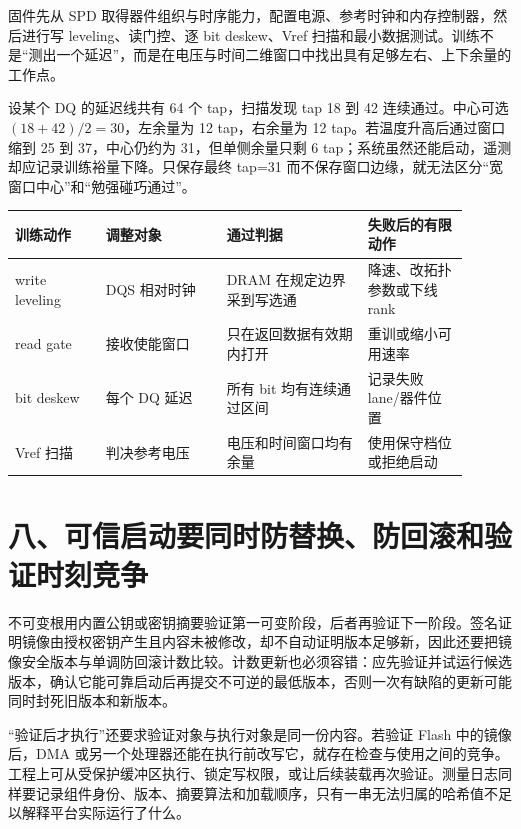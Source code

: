 
固件先从 SPD 取得器件组织与时序能力，配置电源、参考时钟和内存控制器，然后进行写 leveling、读门控、逐 bit deskew、Vref 扫描和最小数据测试。训练不是“测出一个延迟”，而是在电压与时间二维窗口中找出具有足够左右、上下余量的工作点。

设某个 DQ 的延迟线共有 64 个 tap，扫描发现 tap 18 到 42 连续通过。中心可选 $(18+42)/2=30$，左余量为 12 tap，右余量为 12 tap。若温度升高后通过窗口缩到 25 到 37，中心仍约为 31，但单侧余量只剩 6 tap；系统虽然还能启动，遥测却应记录训练裕量下降。只保存最终 tap=31 而不保存窗口边缘，就无法区分“宽窗口中心”和“勉强碰巧通过”。

\begin{longtable}{L{0.18\linewidth}L{0.24\linewidth}L{0.28\linewidth}L{0.20\linewidth}}
\toprule
训练动作 & 调整对象 & 通过判据 & 失败后的有限动作 \\
\midrule
write leveling & DQS 相对时钟 & DRAM 在规定边界采到写选通 & 降速、改拓扑参数或下线 rank \\\tablerowrule
read gate & 接收使能窗口 & 只在返回数据有效期内打开 & 重训或缩小可用速率 \\\tablerowrule
bit deskew & 每个 DQ 延迟 & 所有 bit 均有连续通过区间 & 记录失败 lane/器件位置 \\\tablerowrule
Vref 扫描 & 判决参考电压 & 电压和时间窗口均有余量 & 使用保守档位或拒绝启动 \\
\bottomrule
\end{longtable}

\section{八、可信启动要同时防替换、防回滚和验证时刻竞争}

不可变根用内置公钥或密钥摘要验证第一可变阶段，后者再验证下一阶段。签名证明镜像由授权密钥产生且内容未被修改，却不自动证明版本足够新，因此还要把镜像安全版本与单调防回滚计数比较。计数更新也必须容错：应先验证并试运行候选版本，确认它能可靠启动后再提交不可逆的最低版本，否则一次有缺陷的更新可能同时封死旧版本和新版本。

“验证后才执行”还要求验证对象与执行对象是同一份内容。若验证 Flash 中的镜像后，DMA 或另一个处理器还能在执行前改写它，就存在检查与使用之间的竞争。工程上可从受保护缓冲区执行、锁定写权限，或让后续装载再次验证。测量日志同样要记录组件身份、版本、摘要算法和加载顺序，只有一串无法归属的哈希值不足以解释平台实际运行了什么。


